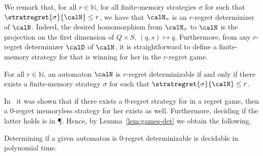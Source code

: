 \documentclass[a4paper]{article}
\begin{document}
We remark that, for all $r \in \mathbb{N}$, for all finite-memory strategies
$\sigma$ for \eve such that $\stratregret{\sigma}{\calN} \le r$, we have that
$\calN_\sigma$ is an $r$-regret determinizer of $\calN$. Indeed, the desired
homomorphism from $\calN_\sigma$ to $\calN$ is the projection on the first
dimension of $Q \times S$, \ie $(q,s) \mapsto q$. Furthermore, from any
$r$-regret determinizer $\calD$ of $\calN$, it is straightforward to define a
finite-memory strategy for \eve that is winning for her in the $r$-regret game.

\begin{lemma}\label{lem:games-det}
	For all $r \in \mathbb{N}$, an automaton $\calN$ is $r$-regret
	determinizable if and only if there exists a finite-memory strategy
	$\sigma$ for \eve such that $\stratregret{\sigma}{\calN} \le r$.
\end{lemma}

In~\cite{akl10} it was shown that if there exists a $0$-regret strategy for \eve
in a regret game, then a $0$-regret memoryless strategy for her exists as well.
Furthermore, deciding if the latter holds is in \P. Hence,
by Lemma~\ref{lem:games-det} we obtain the following.

\begin{proposition}\label{pro:0regret-easy}
	Determining if a given automaton is $0$-regret determinizable is
	decidable in polynomial time.
\end{proposition}
\end{document}
